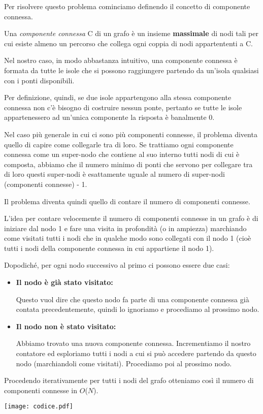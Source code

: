 

Per risolvere questo problema cominciamo definendo il concetto di componente connessa. 

Una \textit{componente connessa} C di un grafo è un insieme \textbf{massimale} di nodi tali per cui esiste almeno un percorso che collega ogni coppia di nodi appartententi a C. 

Nel nostro caso, in modo abbastanza intuitivo, una componente connessa è formata da tutte le isole che si possono raggiungere partendo da un'isola qualsiasi con i ponti disponibili. 

Per definizione, quindi, se due isole appartengono alla stessa componente connessa non c'è bisogno di costruire nessun ponte, pertanto se tutte le isole appartenessero ad un'unica componente la risposta è banalmente 0.


Nel caso più generale in cui ci sono più componenti connesse, il problema diventa quello di capire come collegarle tra di loro.
Se trattiamo ogni componente connessa come un super-nodo che contiene al suo interno tutti nodi di cui è composta, abbiamo che il numero minimo di ponti che servono per collegare tra di loro questi super-nodi è esattamente uguale al numero di super-nodi (componenti connesse) - 1. 

Il problema diventa quindi quello di contare il numero di componenti connesse.

\Implementazione

L'idea per contare velocemente il numero di componenti connesse in un grafo è di iniziare dal nodo 1 e fare una visita in profondità (o in ampiezza) marchiando come visitati tutti i nodi che in qualche modo sono collegati con il nodo 1 (cioè tutti i nodi della componente connessa in cui appartiene il nodo 1). 

Dopodiché, per ogni nodo successivo al primo ci possono essere due casi:
\begin{itemize}
\item \textbf{Il nodo è già stato visitato:}

Questo vuol dire che questo nodo fa parte di una componente connessa già contata precedentemente, quindi lo ignoriamo e procediamo al prossimo nodo.

\item \textbf{Il nodo non è stato visitato:}

Abbiamo trovato una nuova componente connessa. Incrementiamo il nostro contatore ed esploriamo tutti i nodi a cui si può accedere partendo da questo nodo (marchiandoli come visitati). Procediamo poi al prossimo nodo.
\end{itemize}

Procedendo iterativamente per tutti i nodi del grafo otteniamo così il numero di componenti connesse in $O$($N$).

\Codice



\texttt{[image: codice.pdf]}